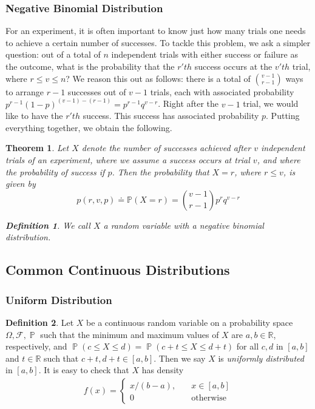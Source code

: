 \documentclass[12pt]{article}
\newcommand{\rr}{\mathbb{R}}
\newcommand{\filter}{\mathcal{F}}
\DeclareMathOperator{\prob}{\mathbb{P}}
\theoremstyle{plain}
\newtheorem{theorem}{Theorem}
\theoremstyle{definition}
\newtheorem*{definition}{Definition}
\theoremstyle{remark}
\numberwithin{equation}{section}  %
\begin{document}
\subsubsection{Negative Binomial Distribution}
For an experiment, it is often important to know just how many trials
one needs to achieve a certain number of successes. To tackle this problem,
we ask a simpler question: out of a total of $n$ independent trials with
either success or failure as the outcome, what is the probability
that the $r'th$ success occurs at the $v'th$ trial, where $r \le v \le n$?
We reason this out as follows: there is a total of $\binom{v-1}{r-1}$ ways to
arrange $r-1$ successes out of $v-1$ trials, each with associated probability
$p^{r-1}{(1 - p)}^{(v-1) - (r-1)} = p^{r-1}q^{v-r}$. Right after the $v-1$ 
trial, we would like to
have the $r'th$ success. This success has associated probability $p$. Putting
everything together, we obtain the following.
\begin{theorem}
	Let $X$ denote the number of successes achieved after $v$ independent 
	trials of an experiment,
	where we assume a success occurs at trial $v$, and where the probability
	of success if $p$. Then the probability that $X=r$, where $r \le v$, is 
	given by
	\begin{equation*}
		p(r, v, p) \doteq \mathbb{P}(X = r) = \binom{v-1}{r-1} p^{r} q^{v-r}
	\end{equation*}
	\begin{definition}
		We call $X$ a random variable with a \emph{negative binomial 
		distribution}.
	\end{definition}
\end{theorem}
\subsection{Common Continuous Distributions}
\subsubsection{Uniform Distribution}
\begin{definition}
	Let $X$ be a continuous random variable on a probability space $\Omega, 
	\filter,
	\prob$ such that the minimum and maximum values of $X$ are $a,b \in \rr$,
	respectively, and $\prob(c \le X \le d ) = \prob(c + t \le X \le d + t)$
	for all $c, d$ in $[a,b]$  and $t \in \rr$ such that $c+t, d+t \in [a,b]$.
	Then we say $X$ is \emph{uniformly distributed} in $[a,b]$. It is easy to 
	check
	that $X$ has density  
	\begin{align*}
		f(x) = \begin{cases}
			x/(b-a), \quad & x \in [a,b] \\
			0 \quad &\text{otherwise}
		\end{cases}
	\end{align*}
\end{definition}
\end{document}
